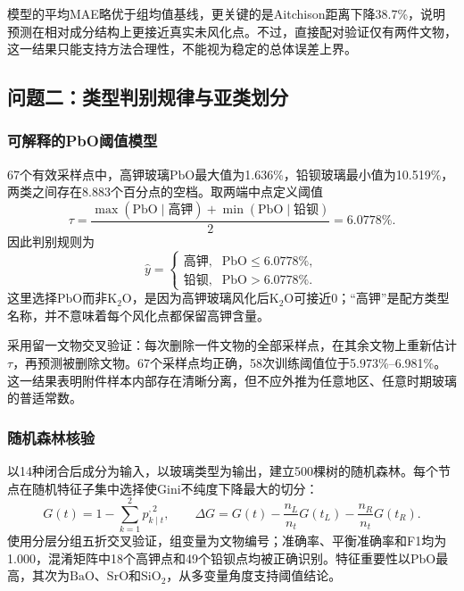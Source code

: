 \documentclass[UTF8,a4paper,zihao=-4,fontset=windows]{ctexart}
\begin{document}
模型的平均MAE略优于组均值基线，更关键的是Aitchison距离下降38.7\%，说明预测在相对成分结构上更接近真实未风化点。不过，直接配对验证仅有两件文物，这一结果只能支持方法合理性，不能视为稳定的总体误差上界。

\subsection{问题二：类型判别规律与亚类划分}

\subsubsection{可解释的PbO阈值模型}

67个有效采样点中，高钾玻璃$\mathrm{PbO}$最大值为1.636\%，铅钡玻璃最小值为10.519\%，两类之间存在8.883个百分点的空档。取两端中点定义阈值
\begin{equation}
  \tau=\frac{\max(\mathrm{PbO}\mid\text{高钾})+
  \min(\mathrm{PbO}\mid\text{铅钡})}{2}=6.0778\%.
\end{equation}
因此判别规则为
\begin{equation}
  \widehat{y}=\begin{cases}
    \text{高钾},& \mathrm{PbO}\leq6.0778\%,\\
    \text{铅钡},& \mathrm{PbO}>6.0778\%.
  \end{cases}
  \label{eq:threshold}
\end{equation}
这里选择$\mathrm{PbO}$而非$\mathrm{K_2O}$，是因为高钾玻璃风化后$\mathrm{K_2O}$可接近0；“高钾”是配方类型名称，并不意味着每个风化点都保留高钾含量。

采用留一文物交叉验证：每次删除一件文物的全部采样点，在其余文物上重新估计$\tau$，再预测被删除文物。67个采样点均正确，58次训练阈值位于5.973\%--6.981\%。这一结果表明附件样本内部存在清晰分离，但不应外推为任意地区、任意时期玻璃的普适常数。

\subsubsection{随机森林核验}

以14种闭合后成分为输入，以玻璃类型为输出，建立500棵树的随机森林。每个节点在随机特征子集中选择使Gini不纯度下降最大的切分：
\begin{equation}
  G(t)=1-\sum_{k=1}^{2}p_{k\mid t}^{,2},\qquad
  \Delta G=G(t)-\frac{n_L}{n_t}G(t_L)-\frac{n_R}{n_t}G(t_R).
\end{equation}
使用分层分组五折交叉验证，组变量为文物编号；准确率、平衡准确率和F1均为1.000，混淆矩阵中18个高钾点和49个铅钡点均被正确识别。特征重要性以$\mathrm{PbO}$最高，其次为$\mathrm{BaO}$、$\mathrm{SrO}$和$\mathrm{SiO_2}$，从多变量角度支持阈值结论。
\end{document}
